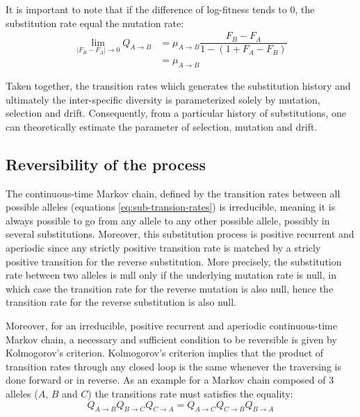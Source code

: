 It is important to note that if the difference of log-fitness tends to $0$, the \gls{substitution} rate equal the mutation rate:
\begin{align}
\lim_{|F_{B} - F_{A}| \to 0} Q_{A \to B} & = \mu_{A \to B}   \dfrac{F_{B} - F_{A}}{{1 - (1 + {F_{A} - F_{B}}) }} \nonumber \\
& =  \mu_{A \to B} 
\end{align}


Taken together, the transition rates which generates the \gls{substitution} history and ultimately the inter-specific diversity is parameterized solely by mutation, selection and drift.
Consequently, from a particular history of substitutions, one can theoretically estimate the parameter of selection, mutation and drift.

\subsection{Reversibility of the process}

The continuous-time Markov chain, defined by the transition rates between all possible alleles (equations \ref{eq:sub-transion-rates}) is irreducible, meaning it is always possible to go from any allele to any other possible allele, possibly in several substitutions.
Moreover, this substitution process is positive recurrent and aperiodic since any strictly positive transition rate is matched by a stricly positive transition for the reverse substitution.
More precisely, the substitution rate between two alleles is null only if the underlying mutation rate is null, in which case the transition rate for the reverse mutation is also null, hence the transition rate for the reverse substitution is also null.

Moreover, for an irreducible, positive recurrent and aperiodic continuous-time Markov chain, a necessary and sufficient condition to be reversible is given by Kolmogorov's criterion.
Kolmogorov's criterion implies that the product of transition rates through any closed loop is the same whenever the traversing is done forward or in reverse.
As an example for a Markov chain composed of $3$ alleles ($A$, $B$ and $C$) the transitions rate must satisfies the equality:
\begin{equation}
Q_{A \to B}Q_{B \to C}Q_{C \to A} = Q_{A \to C}Q_{C \to B}Q_{B \to A}
\end{equation}

